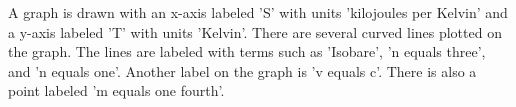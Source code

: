 A graph is drawn with an x-axis labeled 'S' with units 'kilojoules per Kelvin' and a y-axis labeled 'T' with units 'Kelvin'. There are several curved lines plotted on the graph. The lines are labeled with terms such as 'Isobare', 'n equals three', and 'n equals one'. Another label on the graph is 'v equals c'. There is also a point labeled 'm equals one fourth'.